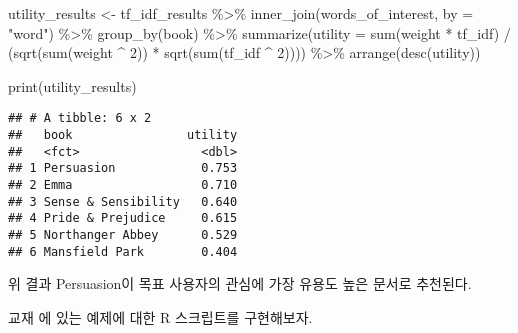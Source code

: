 \documentclass[
]{book}
\newenvironment{Shaded}{\begin{snugshade}}{\end{snugshade}}
\newcommand{\AttributeTok}[1]{\textcolor[rgb]{0.77,0.63,0.00}{#1}}
\newcommand{\DecValTok}[1]{\textcolor[rgb]{0.00,0.00,0.81}{#1}}
\newcommand{\FunctionTok}[1]{\textcolor[rgb]{0.00,0.00,0.00}{#1}}
\newcommand{\NormalTok}[1]{#1}
\newcommand{\OtherTok}[1]{\textcolor[rgb]{0.56,0.35,0.01}{#1}}
\newcommand{\SpecialCharTok}[1]{\textcolor[rgb]{0.00,0.00,0.00}{#1}}
\newcommand{\StringTok}[1]{\textcolor[rgb]{0.31,0.60,0.02}{#1}}
\begin{document}
\begin{Shaded}
\begin{Highlighting}[]
\NormalTok{utility\_results }\OtherTok{\textless{}{-}}\NormalTok{ tf\_idf\_results }\SpecialCharTok{\%\textgreater{}\%}
  \FunctionTok{inner\_join}\NormalTok{(words\_of\_interest, }\AttributeTok{by =} \StringTok{"word"}\NormalTok{) }\SpecialCharTok{\%\textgreater{}\%}
  \FunctionTok{group\_by}\NormalTok{(book) }\SpecialCharTok{\%\textgreater{}\%}
  \FunctionTok{summarize}\NormalTok{(}\AttributeTok{utility =} \FunctionTok{sum}\NormalTok{(weight }\SpecialCharTok{*}\NormalTok{ tf\_idf) }\SpecialCharTok{/} 
\NormalTok{              (}\FunctionTok{sqrt}\NormalTok{(}\FunctionTok{sum}\NormalTok{(weight }\SpecialCharTok{\^{}} \DecValTok{2}\NormalTok{)) }\SpecialCharTok{*} \FunctionTok{sqrt}\NormalTok{(}\FunctionTok{sum}\NormalTok{(tf\_idf }\SpecialCharTok{\^{}} \DecValTok{2}\NormalTok{)))) }\SpecialCharTok{\%\textgreater{}\%}
  \FunctionTok{arrange}\NormalTok{(}\FunctionTok{desc}\NormalTok{(utility))}

\FunctionTok{print}\NormalTok{(utility\_results)}
\end{Highlighting}
\end{Shaded}

\begin{verbatim}
## # A tibble: 6 x 2
##   book                utility
##   <fct>                 <dbl>
## 1 Persuasion            0.753
## 2 Emma                  0.710
## 3 Sense & Sensibility   0.640
## 4 Pride & Prejudice     0.615
## 5 Northanger Abbey      0.529
## 6 Mansfield Park        0.404
\end{verbatim}

위 결과 Persuasion이 목표 사용자의 관심에 가장 유용도 높은 문서로 추천된다.

교재 \citet{jun2012datamining} 에 있는 예제에 대한 R 스크립트를 구현해보자.
\end{document}

